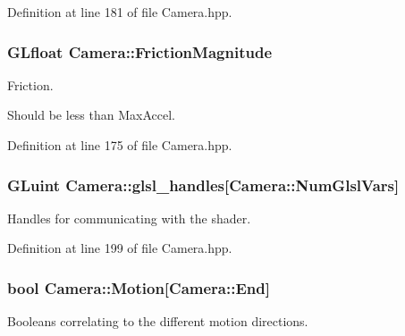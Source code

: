 \-Definition at line 181 of file \-Camera.\-hpp.

\hypertarget{class_camera_a4260507a4e59b2b079a0e1c6a5b64d5c}{
\subsubsection[{\-Friction\-Magnitude}]{\setlength{\rightskip}{0pt plus 5cm}\-G\-Lfloat {\bf \-Camera\-::\-Friction\-Magnitude}}}\label{class_camera_a4260507a4e59b2b079a0e1c6a5b64d5c}


\-Friction. 

\-Should be less than \-Max\-Accel. 

\-Definition at line 175 of file \-Camera.\-hpp.

\hypertarget{class_camera_a1635486d7f9e0d52b241899a270ee335}{
\subsubsection[{glsl\-\_\-handles}]{\setlength{\rightskip}{0pt plus 5cm}\-G\-Luint {\bf \-Camera\-::glsl\-\_\-handles}\mbox{[}\-Camera\-::\-Num\-Glsl\-Vars\mbox{]}}}\label{class_camera_a1635486d7f9e0d52b241899a270ee335}


\-Handles for communicating with the shader. 



\-Definition at line 199 of file \-Camera.\-hpp.

\hypertarget{class_camera_a39746b4fadf30bba6bdc8aa6acfdc6f2}{
\subsubsection[{\-Motion}]{\setlength{\rightskip}{0pt plus 5cm}bool {\bf \-Camera\-::\-Motion}\mbox{[}\-Camera\-::\-End\mbox{]}}}\label{class_camera_a39746b4fadf30bba6bdc8aa6acfdc6f2}


\-Booleans correlating to the different motion directions. 



